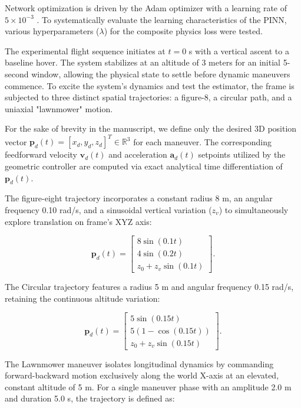 Network optimization is driven by the Adam optimizer with a learning rate of $5 \times 10^{-3}$ \cite{serrano_physics-informed_2024}. To systematically evaluate the learning characteristics of the PINN, various hyperparameters ($\lambda$) for the composite physics loss were tested.

The experimental flight sequence initiates at $t = 0$ s with a vertical ascent to a baseline hover. The system stabilizes at an altitude of 3 meters for an initial 5-second window, allowing the physical state to settle before dynamic maneuvers commence. To excite the system's dynamics and test the estimator, the frame is subjected to three distinct spatial trajectories: a figure-8, a circular path, and a uniaxial "lawnmower" motion.

For the sake of brevity in the manuscript, we define only the desired 3D position vector $\mathbf{p}_d(t) = [x_d, y_d, z_d]^T \in \mathbb{R}^3$ for each maneuver. The corresponding feedforward velocity $\mathbf{v}_d(t)$ and acceleration $\mathbf{a}_d(t)$ setpoints utilized by the geometric controller are computed via exact analytical time differentiation of $\mathbf{p}_d(t)$.

The figure-eight trajectory incorporates a constant radius 8 m, an angular frequency 0.10 rad/s, and a sinusoidal vertical variation ($z_v$) to simultaneously explore translation on frame's XYZ axis:

\begin{equation}
    \mathbf{p}_d(t) = \begin{bmatrix}8 \sin(0.1 t) \\
    4 \sin(0.2 t) \\
    z_0 + z_v \sin(0.1 t)\end{bmatrix}.
\end{equation}

The Circular trajectory features a radius 5 m and angular frequency 0.15 rad/s, retaining the continuous altitude variation:

\begin{equation}
    \mathbf{p}_d(t) =
    \begin{bmatrix}
        5 \sin(0.15 t) \\
        5 (1 - \cos(0.15 t)) \\
        z_0 + z_v \sin(0.15 t)
    \end{bmatrix}.
\end{equation}

The Lawnmower maneuver isolates longitudinal dynamics by commanding forward-backward motion exclusively along the world X-axis at an elevated, constant altitude of 5 m. For a single maneuver phase with an amplitude 2.0 m and duration 5.0 s, the trajectory is defined as:

